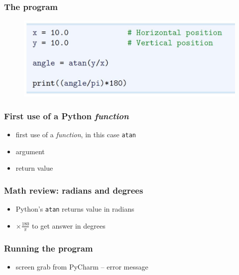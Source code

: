 \documentclass[14pt]{beamer}
\begin{document}
\begin{frame}[fragile]
\frametitle{The program}

\begin{figure}[ht]
	\centering
	\includegraphics[width=\textwidth]{figures/LLp12}
\end{figure}

\end{frame}


\begin{frame}[fragile]
\frametitle{First use of a Python \emph{function}}
\begin{itemize}
\item first use of a \emph{function}, in this case \texttt{atan}
\item argument
\item return value
\end{itemize}

\end{frame}


\begin{frame}[fragile]
\frametitle{Math review: radians and degrees}
\begin{itemize}
\item Python's \texttt{atan} returns value in radians
\item $\times \frac{180}{\pi}$ to get answer in degrees
\end{itemize}
\end{frame}


\begin{frame}[fragile]
\frametitle{Running the program}
\begin{itemize}
\item screen grab from PyCharm -- error message
\end{itemize}
\end{frame}
\end{document}
